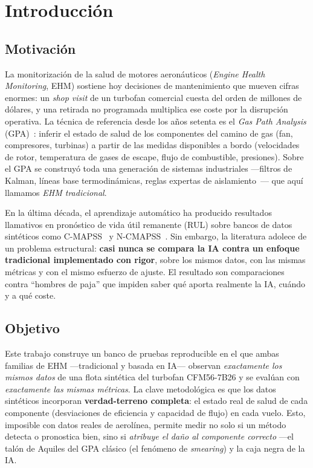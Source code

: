 \chapter{Introducción}
\label{cap:introduccion}

\section{Motivación}

La monitorización de la salud de motores aeronáuticos (\emph{Engine Health Monitoring}, EHM)
sostiene hoy decisiones de mantenimiento que mueven cifras enormes: un \emph{shop visit} de un
turbofan comercial cuesta del orden de millones de dólares, y una retirada no programada
multiplica ese coste por la disrupción operativa. La técnica de referencia desde los años setenta
es el \emph{Gas Path Analysis} (GPA)~\cite{Urban1975}: inferir el estado de salud de los
componentes del camino de gas (fan, compresores, turbinas) a partir de las medidas disponibles a
bordo (velocidades de rotor, temperatura de gases de escape, flujo de combustible, presiones).
Sobre el GPA se construyó toda una generación de sistemas industriales ---filtros de Kalman,
líneas base termodinámicas, reglas expertas de aislamiento~\cite{Volponi2014}--- que aquí
llamamos \emph{EHM tradicional}.

En la última década, el aprendizaje automático ha producido resultados llamativos en pronóstico
de vida útil remanente (RUL) sobre bancos de datos sintéticos como
C-MAPSS~\cite{Saxena2008} y N-CMAPSS~\cite{AriasChao2021}. Sin embargo, la literatura adolece de
un problema estructural: \textbf{casi nunca se compara la IA contra un enfoque tradicional
implementado con rigor}, sobre los mismos datos, con las mismas métricas y con el mismo esfuerzo
de ajuste. El resultado son comparaciones contra ``hombres de paja'' que impiden saber qué aporta
realmente la IA, cuándo y a qué coste.

\section{Objetivo}

Este trabajo construye un banco de pruebas reproducible en el que ambas familias de EHM
---tradicional y basada en IA--- observan \emph{exactamente los mismos datos} de una flota
sintética del turbofan CFM56-7B26 y se evalúan con \emph{exactamente las mismas métricas}. La
clave metodológica es que los datos sintéticos incorporan \textbf{verdad-terreno completa}: el
estado real de salud de cada componente (desviaciones de eficiencia y capacidad de flujo) en cada
vuelo. Esto, imposible con datos reales de aerolínea, permite medir no solo si un método detecta
o pronostica bien, sino si \emph{atribuye el daño al componente correcto} ---el talón de Aquiles
del GPA clásico (el fenómeno de \emph{smearing}) y la caja negra de la IA.

